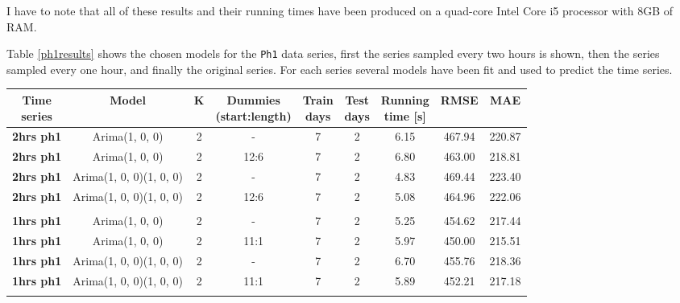 \documentclass[12pt,a4paper,titlepage]{report}
\begin{document}
I have to note that all of these results and their running times have been produced on a quad-core Intel Core i5 processor with 8GB of RAM.

Table \ref{ph1results} shows the chosen models for the \texttt{Ph1} data series, first the series sampled every two hours is shown, then the series sampled every one hour, and finally the original series. For each series several models have been fit and used to predict the time series.

\begin{table}[htbp]
    \begin{tabular}{|c|c|c|c|c|c|c|c|c|}
        \hline
        \makecell{\textbf{Time} \\ \textbf{series}} & \textbf{Model}          & \textbf{K} & \makecell{\textbf{Dummies} \\ \textbf{(start:length)}} & \makecell{\textbf{Train} \\ \textbf{days}} & \makecell{\textbf{Test}\\ \textbf{days}} & \makecell{\textbf{Running} \\ \textbf{time {[}s{]}}} & \textbf{RMSE} & \textbf{MAE} \\ \hline
        \textbf{2hrs ph1} & Arima(1, 0, 0)          & 2 & -    & 7 & 2 & 6.15     & 467.94 & 220.87 \\ \hline
        \textbf{2hrs ph1} & Arima(1, 0, 0)          & 2 & 12:6  & 7 & 2 & 6.80     & 463.00 & 218.81 \\ \hline
        \textbf{2hrs ph1} & Arima(1, 0, 0)(1, 0, 0) & 2 & -    & 7 & 2 & 4.83     & 469.44 & 223.40 \\ \hline
        \textbf{2hrs ph1} & Arima(1, 0, 0)(1, 0, 0) & 2 & 12:6  & 7 & 2 & 5.08     & 464.96 & 222.06 \\ \hline
        \textbf{}         &                         &   &      &   &   &          &        &        \\ \hline
        \textbf{1hrs ph1} & Arima(1, 0, 0)          & 2 & -    & 7 & 2 & 5.25     & 454.62 & 217.44 \\ \hline
        \textbf{1hrs ph1} & Arima(1, 0, 0)          & 2 & 11:1 & 7 & 2 & 5.97     & 450.00 & 215.51 \\ \hline
        \textbf{1hrs ph1} & Arima(1, 0, 0)(1, 0, 0) & 2 & -    & 7 & 2 & 6.70     & 455.76 & 218.36 \\ \hline
        \textbf{1hrs ph1} & Arima(1, 0, 0)(1, 0, 0) & 2 & 11:1 & 7 & 2 & 5.89     & 452.21 & 217.18 \\ \hline
        \textbf{}         &                         &   &      &   &   &          &        &        \\ \hline

\end{tabular}
\end{table}
\end{document}
